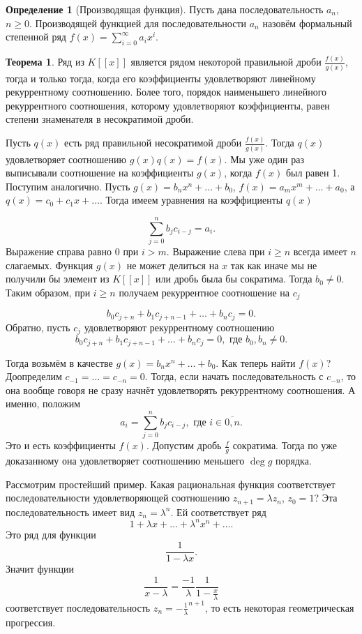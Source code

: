 \documentclass[10pt,a4paper,oneside]{book}
\theoremstyle{definition}
\newtheorem{defn}{Определение}
\newtheorem{thm}{Теорема}
\newcommand{\ovl}{\overline}
\def\thrm{\begin{thm}}
\def\ethrm{\end{thm}}
\def\dfn{\begin{defn}}
\def\edfn{\end{defn}}
\begin{document}
\dfn[Производящая функция] Пусть дана последовательность $a_n$, $n\geq 0$. Производящей функцией для последовательности $a_n$ назовём формальный степенной ряд $f(x)=\sum_{i=0}^{\infty} a_ix^i$.
\edfn



\thrm Ряд из $K[[x]]$ является рядом некоторой правильной дроби $\frac{f(x)}{g(x)}$, тогда и только тогда, когда его коэффициенты  удовлетворяют линейному рекуррентному соотношению. Более того, порядок наименьшего линейного рекуррентного соотношения, которому удовлетворяют коэффициенты, равен степени знаменателя в несократимой дроби.
\ethrm

\proof
Пусть $q(x)$ есть ряд правильной несократимой дроби $\frac{f(x)}{g(x)}$. Тогда $q(x)$ удовлетворяет соотношению $g(x)q(x)=f(x)$. Мы уже один раз выписывали соотношение на коэффициенты $g(x)$, когда $f(x)$ был равен 1. Поступим аналогично. Пусть $g(x)=b_nx^n+\dots +b_0$, $f(x)=a_mx^m+\dots +a_0$, а $q(x)=c_0+c_1x+\dots$. Тогда имеем уравнения на коэффициенты $q(x)$

$$ \sum_{j=0}^{n} b_j c_{i-j} =a_i .$$
Выражение справа равно 0 при $i>m$. Выражение слева при $i\geq n$ всегда имеет $n$ слагаемых. Функция $g(x)$ не может делиться на $x$ так как иначе мы не получили бы элемент из $K[[x]]$ или дробь была бы сократима. Тогда $b_0\neq 0$. Таким образом, при $i\geq n$ получаем рекуррентное соотношение на $c_j$

$$ b_0 c_{j+n}+b_1 c_{j+n-1}+\dots + b_n c_j=0.$$
Обратно, пусть $c_j$ удовлетворяют рекуррентному соотношению 
$$ b_0 c_{j+n}+b_1 c_{j+n-1}+\dots + b_n c_j=0, \text{ где } b_0,b_n \neq 0.$$

Тогда возьмём в качестве $g(x)= b_n x^n+\dots+b_0$. Как теперь найти $f(x)$? Доопределим $c_{-1}=\dots=c_{-n}=0$. Тогда, если начать последовательность с $c_{-n}$, то она вообще говоря не сразу начнёт удовлетворять рекуррентному соотношения. А именно, положим 
$$a_i= \sum_{j=0}^{n} b_{j} c_{i-j}, \text{ где } i\in \ovl{0,n}.$$
Это и есть коэффициенты $f(x)$. Допустим дробь $\frac{f}{g}$ сократима. Тогда по уже доказанному она удовлетворяет соотношению меньшего $\deg g$ порядка.
\endproof

Рассмотрим простейший пример. Какая рациональная функция соответствует последовательности удовлетворяющей соотношению $z_{n+1}=\lambda z_n$, $z_0=1$? Эта последовательность имеет вид $z_n=\lambda^n$. Ей соответствует ряд $$1+ \lambda x+\dots + \lambda^nx^n+\dots .$$  
Это ряд для функции 
$$\frac{1}{1-\lambda x}.$$
Значит функции 
$$\frac{1}{x-\lambda}=\frac{-1}{\lambda}\frac{1}{1-\frac{x}{\lambda}}$$
соответствует последовательность $z_n=-{\frac{1}{\lambda}^{n+1}}$, то есть некоторая геометрическая прогрессия. 
\end{document}
